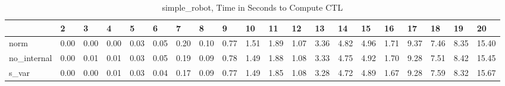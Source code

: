 \begin{table}
\centering
\caption{simple_robot, Time in Seconds to Compute CTL}
\label{simple_robot_CTL_time}
\begin{tabular}{llllllllllllllllllll}
\toprule
{} &     2 &     3 &     4 &     5 &     6 &     7 &     8 &     9 &    10 &    11 &    12 &    13 &    14 &    15 &    16 &    17 &    18 &    19 &     20 \\
\midrule
norm        &  0.00 &  0.00 &  0.00 &  0.03 &  0.05 &  0.20 &  0.10 &  0.77 &  1.51 &  1.89 &  1.07 &  3.36 &  4.82 &  4.96 &  1.71 &  9.37 &  7.46 &  8.35 &  15.40 \\
no\_internal &  0.00 &  0.01 &  0.01 &  0.03 &  0.05 &  0.19 &  0.09 &  0.78 &  1.49 &  1.88 &  1.08 &  3.33 &  4.75 &  4.92 &  1.70 &  9.28 &  7.51 &  8.42 &  15.45 \\
s\_var       &  0.00 &  0.00 &  0.01 &  0.03 &  0.04 &  0.17 &  0.09 &  0.77 &  1.49 &  1.85 &  1.08 &  3.28 &  4.72 &  4.89 &  1.67 &  9.28 &  7.59 &  8.32 &  15.67 \\
\bottomrule
\end{tabular}
\end{table}

